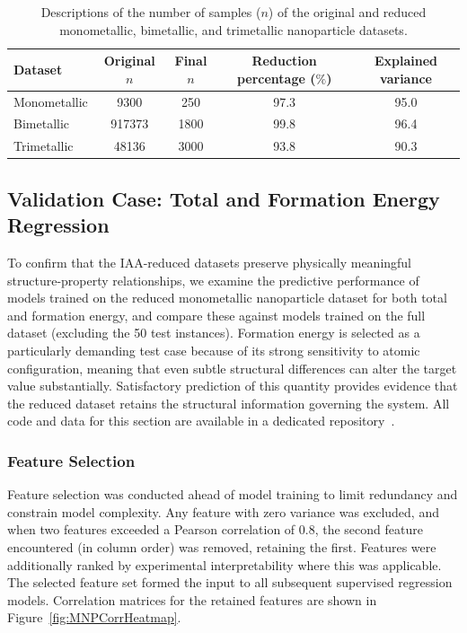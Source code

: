 \documentclass{WileyMSP-template}
\newcommand{\revision}[1]{{\color{red}#1}}
\begin{document}
\begin{table}[t]
\caption{Descriptions of the number of samples ($n$) of the original and reduced monometallic, bimetallic, and trimetallic nanoparticle datasets.}
\centering
\small
\begin{tabular}[width=\textwidth]{l|cccc}
\hline
Dataset      & Original $n$ & Final $n$ & Reduction percentage ($\%$) & Explained variance \\
\hline
Monometallic &         9300 &       250 &                        97.3 &               95.0 \\
Bimetallic   &       917373 &      1800 &                        99.8 &               96.4 \\
Trimetallic  &        48136 &      3000 &                        93.8 &               90.3 \\
\hline
\end{tabular}
\label{tab:redRedOutcomeReducedData}
\end{table}


\subsection{Validation Case: Total and Formation Energy Regression}
\label{sec:MNPregEtotEform}

To confirm that the IAA-reduced datasets preserve physically meaningful structure-property relationships, we examine the predictive performance of models trained on the reduced monometallic nanoparticle dataset for both total and formation energy, and compare these against models trained on \revision{the full dataset (excluding the 50 test instances)}. Formation energy is selected as a particularly demanding test case because of its strong sensitivity to atomic configuration, meaning that even subtle structural differences can alter the target value substantially. Satisfactory prediction of this quantity provides evidence that the reduced dataset retains the structural information governing the system. All code and data for this section are available in a dedicated repository~\cite{MNPERegRepo}.

\subsubsection{Feature Selection}
\label{sec:featSelection}

Feature selection was conducted ahead of model training to limit redundancy and constrain model complexity. Any feature with zero variance was excluded, and when two features exceeded a Pearson correlation of 0.8, \revision{the second feature encountered (in column order) was removed, retaining the first}. Features were additionally ranked by experimental interpretability where this was applicable. The selected feature set formed the input to all subsequent supervised regression models. Correlation matrices for the retained features are shown in Figure~\ref{fig:MNPCorrHeatmap}.
\end{document}
